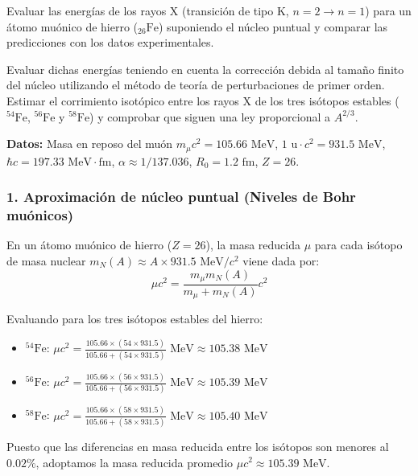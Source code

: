\begin{problema}
Evaluar las energías de los rayos X (transición de tipo K, $n=2 \to n=1$) para un átomo muónico de hierro (${}_{26}\text{Fe}$) suponiendo el núcleo puntual y comparar las predicciones con los datos experimentales.

Evaluar dichas energías teniendo en cuenta la corrección debida al tamaño finito del núcleo utilizando el método de teoría de perturbaciones de primer orden. Estimar el corrimiento isotópico entre los rayos X de los tres isótopos estables (${}^{54}\text{Fe}$, ${}^{56}\text{Fe}$ y ${}^{58}\text{Fe}$) y comprobar que siguen una ley proporcional a $A^{2/3}$.

\textbf{Datos:} Masa en reposo del muón $m_\mu c^2 = 105.66\text{ MeV}$, $1\text{ u} \cdot c^2 = 931.5\text{ MeV}$, $\hbar c = 197.33\text{ MeV}\cdot\text{fm}$, $\alpha \approx 1/137.036$, $R_0 = 1.2\text{ fm}$, $Z = 26$.

\tcblower

\subsubsection*{1. Aproximación de núcleo puntual (Niveles de Bohr muónicos)}

En un átomo muónico de hierro ($Z = 26$), la masa reducida $\mu$ para cada isótopo de masa nuclear $m_N(A) \approx A \times 931.5\text{ MeV}/c^2$ viene dada por:
\begin{equation*}
\mu c^2 = \frac{m_\mu m_N(A)}{m_\mu + m_N(A)} c^2
\end{equation*}

Evaluando para los tres isótopos estables del hierro:
\begin{itemize}
    \item ${}^{54}\text{Fe}$: $\mu c^2 = \frac{105.66 \times (54 \times 931.5)}{105.66 + (54 \times 931.5)}\text{ MeV} \approx 105.38\text{ MeV}$
    \item ${}^{56}\text{Fe}$: $\mu c^2 = \frac{105.66 \times (56 \times 931.5)}{105.66 + (56 \times 931.5)}\text{ MeV} \approx 105.39\text{ MeV}$
    \item ${}^{58}\text{Fe}$: $\mu c^2 = \frac{105.66 \times (58 \times 931.5)}{105.66 + (58 \times 931.5)}\text{ MeV} \approx 105.40\text{ MeV}$
\end{itemize}

Puesto que las diferencias en masa reducida entre los isótopos son menores al $0.02\%$, adoptamos la masa reducida promedio $\mu c^2 \approx 105.39\text{ MeV}$.


\end{problema}
